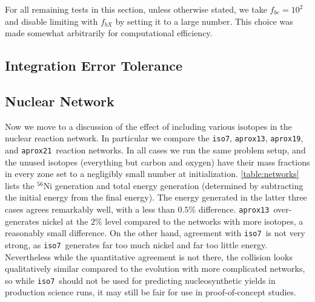 \documentclass[twocolumn,numberedappendix]{../aastex6}
\newcommand{\isoseven}{\texttt{iso7}}
\newcommand{\aproxthirteen}{\texttt{aprox13}}
\newcommand{\aproxnineteen}{\texttt{aprox19}}
\newcommand{\aproxtwentyone}{\texttt{aprox21}}
\begin{document}

For all remaining tests in this section, unless otherwise stated, we take $f_{be} = 10^2$
and disable limiting with $f_{bX}$ by setting it to a large number. This choice was made
somewhat arbitrarily for computational efficiency.


\subsection{Integration Error Tolerance}
\label{sec:parameters:tolerance}




\subsection{Nuclear Network}
\label{sec:parameters:network}

Now we move to a discussion of the effect of including various isotopes
in the nuclear reaction network. In particular we compare the \isoseven, \aproxthirteen,
\aproxnineteen, and \aproxtwentyone\ reaction networks. In all cases we run
the same problem setup, and the unused isotopes (everything but carbon and oxygen)
have their mass fractions in every zone set to a negligibly small number at initialization.
\autoref{table:networks} lists the $^{56}$Ni generation and total energy generation (determined
by subtracting the initial energy from the final energy). The energy generated in the latter
three cases agrees remarkably well, with a less than $0.5\%$ difference. \aproxthirteen\
over-generates nickel at the $2\%$ level compared to the networks with more isotopes, a reasonably
small difference. On the other hand, agreement with \isoseven\ is not very strong, as \isoseven\
generates far too much nickel and far too little energy. Nevertheless while the quantitative
agreement is not there, the collision looks qualitatively similar compared to the evolution with
more complicated networks, so while \isoseven\ should not be used for predicting nucleosynthetic
yields in production science runs, it may still be fair for use in proof-of-concept studies.


\end{document}
